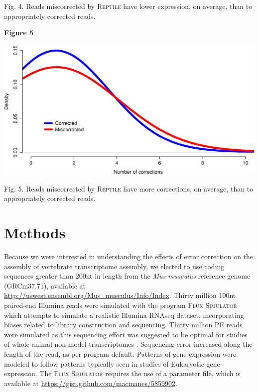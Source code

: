 \documentclass[11pt]{article}
\begin{document}
\noindent
\begin{changemargin}{2cm}{2cm}
Fig. 4. Reads miscorrected by \textsc{Reptile} have lower expression, on average, than to appropriately corrected reads.
\end{changemargin}
\vspace{10mm}



\textbf{\hypertarget{Figure 5}{Figure 5}} \\
\centerline{\includegraphics[width=20.0\baselineskip]{FigX.eps}}

\noindent
\begin{changemargin}{2cm}{2cm}
Fig. 5. Reads miscorrected by \textsc{Reptile} have more corrections, on average, than to appropriately corrected reads.
\end{changemargin}
\vspace{10mm}



\section*{Methods}
Because we were interested in understanding the effects of error correction on the assembly of vertebrate transcriptome assembly, we elected to use coding sequences greater than 200nt in length from the \textit{Mus musculus} reference genome (GRCm37.71), available at \url{http://uswest.ensembl.org/Mus_musculus/Info/Index}.  Thirty million 100nt paired-end Illumina reads were simulated with the program \textsc{Flux Simulator} \citep{Griebel:2012ti} which attempts to simulate a realistic Illumina RNAseq dataset, incorporating biases related to library construction and sequencing. Thirty million PE reads were simulated as this sequencing effort was suggested to be optimal for studies of whole-animal non-model transcriptomes \citep{Francis:2013gc}. Sequencing error increased along the length of the read, as per program default. Patterns of gene expression were modeled to follow patterns typically seen in studies of Eukaryotic gene expression. The \textsc{Flux Simulator} requires the use of a parameter file, which is available at \url{https://gist.github.com/macmanes/5859902}.  \\
\end{document}
